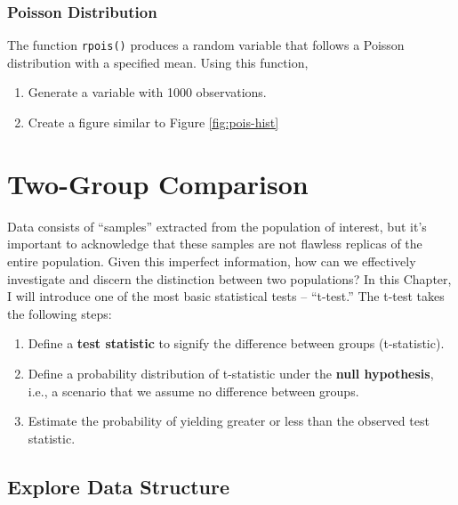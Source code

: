\documentclass[
]{book}
\providecommand{\tightlist}{%
  \setlength{\itemsep}{0pt}\setlength{\parskip}{0pt}}
\begin{document}
\hypertarget{poisson-distribution}{%
\subsection{Poisson Distribution}\label{poisson-distribution}}

The function \texttt{rpois()} produces a random variable that follows a Poisson distribution with a specified mean. Using this function,

\begin{enumerate}
\def\labelenumi{\arabic{enumi}.}
\tightlist
\item
  Generate a variable with 1000 observations.
\item
  Create a figure similar to Figure \ref{fig:pois-hist}
\end{enumerate}

\hypertarget{two-group-comparison}{%
\chapter{Two-Group Comparison}\label{two-group-comparison}}

Data consists of ``samples'' extracted from the population of interest, but it's important to acknowledge that these samples are not flawless replicas of the entire population. Given this imperfect information, how can we effectively investigate and discern the distinction between two populations? In this Chapter, I will introduce one of the most basic statistical tests -- ``t-test.'' The t-test takes the following steps:

\begin{enumerate}
\def\labelenumi{\arabic{enumi}.}
\tightlist
\item
  Define a \textbf{test statistic} to signify the difference between groups (t-statistic).
\item
  Define a probability distribution of t-statistic under the \textbf{null hypothesis}, i.e., a scenario that we assume no difference between groups.
\item
  Estimate the probability of yielding greater or less than the observed test statistic.
\end{enumerate}

\hypertarget{explore-data-structure}{%
\section{Explore Data Structure}\label{explore-data-structure}}
\end{document}
